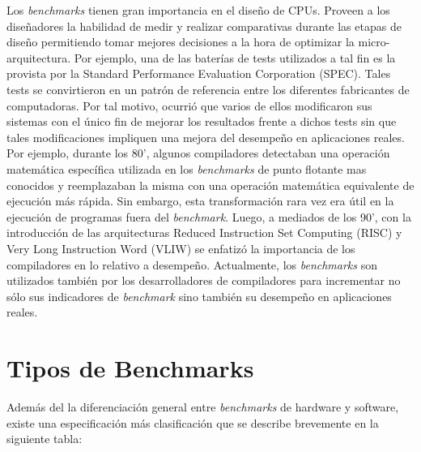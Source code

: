 Los \textit{benchmarks} tienen gran importancia en el diseño de
CPUs. Proveen a los diseñadores la habilidad de medir y realizar
comparativas durante las etapas de diseño permitiendo tomar mejores
decisiones a la hora de optimizar la micro-arquitectura. Por ejemplo,
una de las baterías de tests utilizados a tal fin es la provista por
la Standard Performance Evaluation Corporation (SPEC). Tales tests se
convirtieron en un patrón de referencia entre los diferentes
fabricantes de computadoras. Por tal motivo, ocurrió que varios de
ellos modificaron sus sistemas con el único fin de mejorar los
resultados frente a dichos tests sin que tales modificaciones
impliquen una mejora del desempeño en aplicaciones reales. Por
ejemplo, durante los 80', algunos compiladores detectaban una
operación matemática específica utilizada en los \textit{benchmarks}
de punto flotante mas conocidos y reemplazaban la misma con una
operación matemática equivalente de ejecución más rápida. Sin embargo,
esta transformación rara vez era útil en la ejecución de programas
fuera del \textit{benchmark}. Luego, a mediados de los 90', con la
introducción de las arquitecturas Reduced Instruction Set Computing
(RISC) y Very Long Instruction Word (VLIW) se enfatizó la importancia
de los compiladores en lo relativo a desempeño. Actualmente, los
\textit{benchmarks} son utilizados también por los desarrolladores de
compiladores para incrementar no sólo sus indicadores de
\textit{benchmark} sino también su desempeño en aplicaciones
reales. 



\section{Tipos de Benchmarks}

Además del la diferenciación general entre \textit{benchmarks} de
hardware y software, existe una especificación más clasificación que se
describe brevemente en la siguiente tabla:

